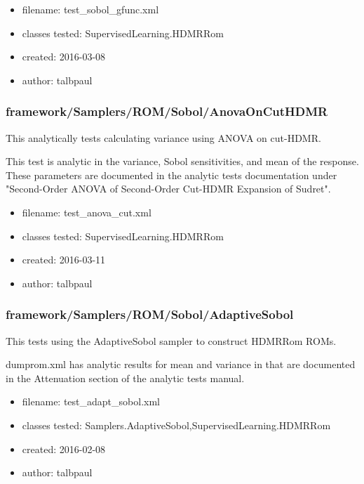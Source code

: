       \begin{itemize}
          \item filename: test\_sobol\_gfunc.xml
          \item classes tested: SupervisedLearning.HDMRRom
          \item created: 2016-03-08
          \item author: talbpaul
      \end{itemize}
    \subsubsection{framework/Samplers/ROM/Sobol/AnovaOnCutHDMR}
      
      This analytically tests calculating variance using ANOVA on cut-HDMR.
    

      
      This test is analytic in the variance, Sobol sensitivities, and mean of the response.  These parameters
      are documented in the analytic tests documentation under "Second-Order ANOVA of Second-Order Cut-HDMR Expansion of Sudret".
    
      \begin{itemize}
          \item filename: test\_anova\_cut.xml
          \item classes tested: SupervisedLearning.HDMRRom
          \item created: 2016-03-11
          \item author: talbpaul
      \end{itemize}
    \subsubsection{framework/Samplers/ROM/Sobol/AdaptiveSobol}
      
      This tests using the AdaptiveSobol sampler to construct HDMRRom ROMs.
    

      
      dumprom.xml has analytic results for mean and variance in that are documented in the Attenuation
      section of the analytic tests manual.
    
      \begin{itemize}
          \item filename: test\_adapt\_sobol.xml
          \item classes tested: Samplers.AdaptiveSobol,SupervisedLearning.HDMRRom
          \item created: 2016-02-08
          \item author: talbpaul
      \end{itemize}
